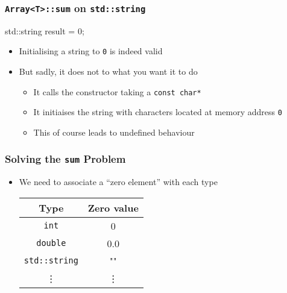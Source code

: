 \begin{frame}
  \frametitle{\texttt{Array<T>::sum} on \texttt{std::string}}
  \begin{center} \ttfamily
    std::string result = 0;
  \end{center}
  \begin{itemize}
    \item Initialising a string to \texttt{0} is indeed valid \cpp
    \item But sadly, it does not to what you want it to do
          \begin{itemize}
            \item It calls the constructor taking a \texttt{const char*}
            \item It initiaises the string with characters located at memory address \texttt{0}
            \item This of course leads to undefined behaviour
          \end{itemize}
  \end{itemize}
\end{frame}

\begin{frame}
  \frametitle{Solving the \texttt{sum} Problem}
  \begin{itemize}
    \item We need to associate a ``zero element'' with each type
          \begin{center}
            \begin{tabular}{cc}
              \textbf{Type} & \textbf{Zero value} \\
              \toprule
              \texttt{int} & 0 \\
              \texttt{double} & 0.0 \\
              \texttt{std::string} & "" \\
              \vdots & \vdots \\
              \bottomrule
            \end{tabular}
          \end{center}
  \end{itemize}
\end{frame}

